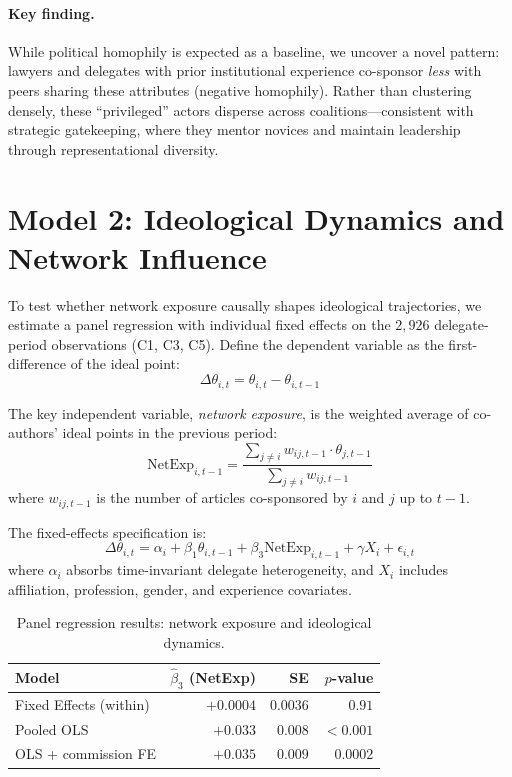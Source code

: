 \documentclass[11pt,a4paper]{article}
\begin{document}
\paragraph{Key finding.} While political homophily is expected as a baseline, we uncover a novel pattern: lawyers and delegates with prior institutional experience co-sponsor \emph{less} with peers sharing these attributes (negative homophily). Rather than clustering densely, these ``privileged'' actors disperse across coalitions---consistent with strategic gatekeeping, where they mentor novices and maintain leadership through representational diversity.

\section{Model 2: Ideological Dynamics and Network Influence}

To test whether network exposure causally shapes ideological trajectories, we estimate a panel regression with individual fixed effects on the $2{,}926$ delegate-period observations (C1, C3, C5). Define the dependent variable as the first-difference of the ideal point:
\begin{equation}
  \Delta\theta_{i,t} = \theta_{i,t} - \theta_{i,t-1}
\end{equation}

The key independent variable, \emph{network exposure}, is the weighted average of co-authors' ideal points in the previous period:
\begin{equation}
  \text{NetExp}_{i,t-1} = \frac{\sum_{j \neq i} w_{ij,t-1} \cdot \theta_{j,t-1}}{\sum_{j \neq i} w_{ij,t-1}}
\end{equation}
where $w_{ij,t-1}$ is the number of articles co-sponsored by $i$ and $j$ up to $t-1$.

The fixed-effects specification is:
\begin{equation}
  \Delta\theta_{i,t} = \alpha_i + \beta_1 \theta_{i,t-1} + \beta_3 \text{NetExp}_{i,t-1} + \gamma X_i + \epsilon_{i,t}
\end{equation}
where $\alpha_i$ absorbs time-invariant delegate heterogeneity, and $X_i$ includes affiliation, profession, gender, and experience covariates.

\begin{table}[H]
\centering
\caption{Panel regression results: network exposure and ideological dynamics.}
\label{tab:panel}
\begin{tabular}{lrrr}
\toprule
Model & $\hat{\beta}_3$ (NetExp) & SE & $p$-value \\
\midrule
Fixed Effects (within)     & $+0.0004$ & $0.0036$ & $0.91$   \\
Pooled OLS                 & $+0.033$  & $0.008$  & $<0.001$ \\
OLS + commission FE        & $+0.035$  & $0.009$  & $0.0002$ \\
\bottomrule
\end{tabular}
\end{table}
\end{document}
